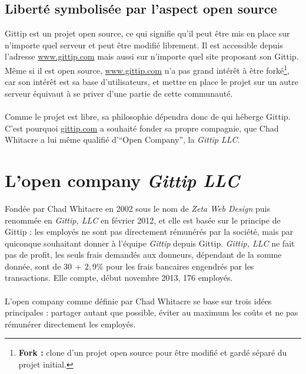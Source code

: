     \subsection{Liberté symbolisée par l'aspect open source}

Gittip est un projet open source, ce qui signifie qu'il peut être mis en place
sur n'importe quel serveur et peut être modifié librement.  Il est accessible
depuis l'adresse \url{www.gittip.com} mais aussi sur n'importe quel site
proposant son Gittip. Même si il est open source, \url{www.gittip.com} n'a pas
grand intérêt à être forké\footnote{\textbf{Fork :} clone d'un projet open
source pour être modifié et gardé séparé du projet initial.}, car son intérêt
est sa base d'utilisateurs, et mettre en place le projet sur un autre serveur
équivaut à se priver d'une partie de cette communauté.

\paragraph{}
Comme le projet est libre, sa philosophie dépendra donc de qui héberge Gittip.
C'est pourquoi \url{gittip.com} a souhaité fonder sa propre compagnie, que Chad
Whitacre a lui même qualifié d'``Open Company'', la \emph{Gittip LLC}.


    \section{L'open company \emph{Gittip LLC}}

Fondée par Chad Whitacre en 2002 sous le nom de \emph{Zeta Web Design} puis
renommée en \emph{Gittip, LLC} en février 2012, et elle est basée sur le
principe de Gittip : les employés ne sont pas directement rémunérés par la
société, mais par quiconque souhaitant donner à l'équipe \emph{Gittip} depuis
Gittip. \emph{Gittip, LLC} ne fait pas de profit, les seuls frais demandés aux
donneurs, dépendant de la somme donnée, sont de $30$\textcent $\, + \, 2,9\%{}$
pour les frais bancaires engendrés par les transactions. Elle compte,
début novembre 2013, 176 employés.

\paragraph{}
L'open company comme définie par Chad Whitacre se base sur trois idées
principales : partager autant que possible, éviter au maximum les coûts et ne
pas rémunérer directement les employés.

